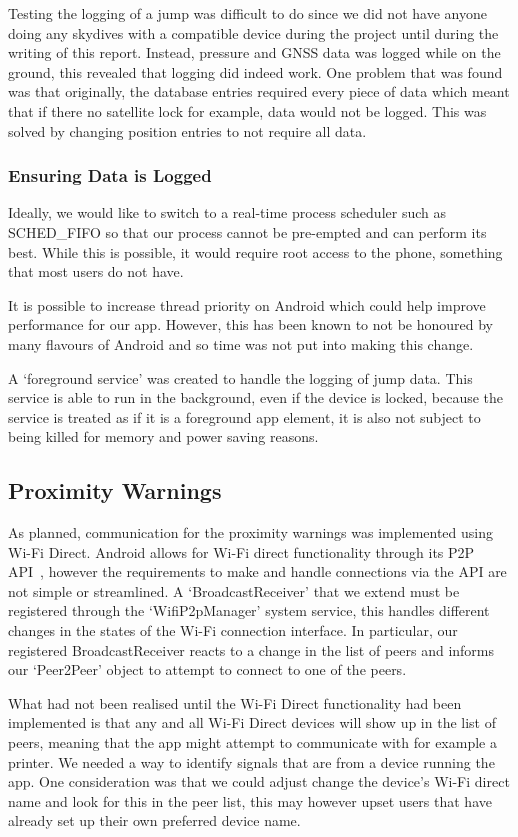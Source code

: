 Testing the logging of a jump was difficult to do since we did not have anyone doing any skydives with a compatible device during the project until during the writing of this report. Instead, pressure and GNSS data was logged while on the ground, this revealed that logging did indeed work. One problem that was found was that originally, the database entries required every piece of data which meant that if there no satellite lock for example, data would not be logged. This was solved by changing position entries to not require all data.

\subsubsection{Ensuring Data is Logged}
Ideally, we would like to switch to a real-time process scheduler such as SCHED\_FIFO so that our process cannot be pre-empted and can perform its best. While this is possible, it would require root access to the phone, something that most users do not have.

It is possible to increase thread priority on Android which could help improve performance for our app. However, this has been known to not be honoured by many flavours of Android and so time was not put into making this change.

A `foreground service' was created to handle the logging of jump data. This service is able to run in the background, even if the device is locked, because the service is treated as if it is a foreground app element, it is also not subject to being killed for memory and power saving reasons.

\subsection{Proximity Warnings}
As planned, communication for the proximity warnings was implemented using Wi-Fi Direct. Android allows for Wi-Fi direct functionality through its P2P API~\cite{_creating_????}, however the requirements to make and handle connections via the API are not simple or streamlined. A `BroadcastReceiver' that we extend must be registered through the `WifiP2pManager' system service, this handles different changes in the states of the Wi-Fi connection interface. In particular, our registered BroadcastReceiver reacts to a change in the list of peers and informs our `Peer2Peer' object to attempt to connect to one of the peers.

What had not been realised until the Wi-Fi Direct functionality had been implemented is that any and all Wi-Fi Direct devices will show up in the list of peers, meaning that the app might attempt to communicate with for example a printer. We needed a way to identify signals that are from a device running the app. One consideration was that we could adjust change the device's Wi-Fi direct name and look for this in the peer list, this may however upset users that have already set up their own preferred device name.

